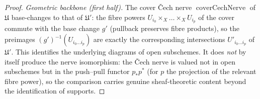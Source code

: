 \begin{proof}
  \emph{Geometric backbone (first half).} The cover {\v C}ech nerve
  \(\operatorname{coverCechNerve}\) of \(\mathfrak{U}\) base-changes to that of
  \(\mathfrak{U}'\): the fibre powers \(U_{i_0} \times_X \dots \times_X U_{i_p}\) of the
  cover commute with the base change \(g'\) (pullback preserves fibre products), so the
  preimages \((g')^{-1}(U_{i_0\dots i_p})\) are exactly the corresponding intersections
  \(U'_{i_0\dots i_p}\) of \(\mathfrak{U}'\). This identifies the underlying diagrams of
  open subschemes. It does \emph{not} by itself produce the nerve isomorphism: the
  {\v C}ech nerve is valued not in open subschemes but in the push--pull functor
  \(p_* p^*\) (for \(p\) the projection of the relevant fibre power), so the comparison
  carries genuine sheaf-theoretic content beyond the identification of supports.


\end{proof}
